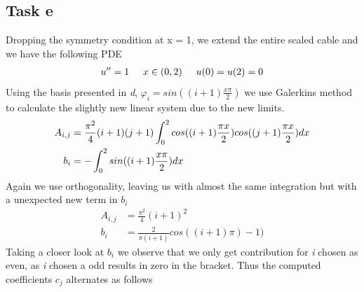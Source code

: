 \documentclass[a4paper,norsk]{article}
\begin{document}
\subsection*{Task e}
Dropping the symmetry condition at x = 1, we extend the entire scaled cable and we have the following PDE
\begin{align*}
u'' = 1 \hspace{5mm} x \in (0,2) \hspace{5mm}u(0)=u(2)=0 
\end{align*}
Using the basis presented in \textit{d}, $\varphi_i = sin((i+1)\frac{x\pi}{2})$ we use Galerkins method to calculate the slightly new linear system due to the new limits. 
\begin{align*}
A_{i,j} &= \frac{\pi^2}{4}(i+1)(j+1) \int_0^2 cos((i+1)\frac{\pi x}{2}) cos((j+1)\frac{\pi x}{2}) dx \\
\vspace{5mm}
b_i &=  -\int_0^2 sin((i+1)\frac{x\pi}{2}) dx \\
\end{align*}
Again we use orthogonality, leaving us with almost the same integration but with a unexpected new term in $b_i$
\begin{align*}
A_{i,j} &= \frac{\pi^2}{4}(i+1)^2\\
b_i &= \frac{2}{\pi(i+1)}cos((i+1)\pi)-1 )
\end{align*}
Taking a closer look at $b_i$ we observe that we only get contribution for \textit{i} chosen as even, as \textit{i} chosen a odd results in zero in the bracket. Thus the computed coefficients $c_j$ alternates as follows
\end{document}
